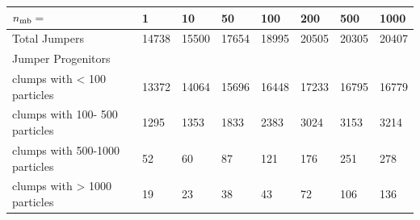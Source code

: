 \documentclass[a4paper,twocolumn,fleqn,usenatbib]{mnras}
\providecommand{\DIFaddbeginFL}{} %
\providecommand{\DIFaddendFL}{} %
\providecommand{\DIFdelendFL}{} %
\newcommand{\DIFaddincludegraphics}[2][]{{\color{blue}\fbox{\DIFOincludegraphics[#1]{#2}}}} %
\DeclareRobustCommand{\DIFaddbeginFL}{\DIFOaddbeginFL \let\includegraphics\DIFaddincludegraphics} %
\DeclareRobustCommand{\DIFaddendFL}{\DIFOaddendFL \let\includegraphics\DIFOincludegraphics} %
\DeclareRobustCommand{\DIFdelendFL}{\DIFOaddendFL \let\includegraphics\DIFOincludegraphics} %
\begin{document}
\begin{table}
\DIFdelendFL \DIFaddbeginFL \label{tab:jumpers}
  {\small

\begin{tabular}[c]{l | p{1cm} | p{1cm} | p{1cm} | p{1cm} | p{1cm} | p{1cm} | p{1cm} |}
    $n_{\rm mb}=$                   & 1           & 10          & 50          & 100         & 
    200         & 500         & 1000        \\
\hline
    Total Jumpers                   &    14738    &    15500    &    17654    &    18995    &    
    20505    &    20305    &    20407    \\
\hline
    Jumper Progenitors & & & & & & & \\
    clumps with <  100 particles    &    13372    &    14064    &    15696    &    16448    &    
    17233    &    16795    &    16779    \\
    clumps with  100- 500 particles &     1295    &     1353    &     1833    &     2383    &     
    3024    &     3153    &     3214    \\
    clumps with  500-1000 particles &       52    &       60    &       87    &      121    &      
    176    &      251    &      278    \\
    clumps with > 1000 particles    &       19    &       23    &       38    &       43    &       
    72    &      106    &      136    \\
\hline
\end{tabular}


} \DIFaddendFL %
\end{table}
\end{document}
